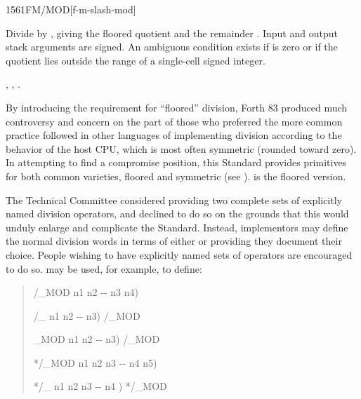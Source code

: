 \begin{worddef}{1561}{FM/MOD}[f-m-slash-mod]
\item {}

	Divide  by , giving the floored quotient
	 and the remainder . Input and output stack
	arguments are signed. An ambiguous condition exists if
	 is zero or if the quotient lies outside the range of
	a single-cell signed integer.

\see {},
	,
	.

	\begin{defer}
	\rationale %
		By introducing the requirement for ``floored'' division,
		Forth 83 produced much controversy and concern on the part of
		those who preferred the more common practice followed in other
		languages of implementing division according to the behavior
		of the host CPU, which is most often symmetric (rounded toward
		zero). In attempting to find a compromise position, this
		Standard provides primitives for both common varieties, floored
		and symmetric (see ).  is the floored
		version.

		The Technical Committee considered providing two complete sets
		of explicitly named division operators, and declined to do so
		on the grounds that this would unduly enlarge and complicate
		the Standard. Instead, implementors may define the normal
		division words in terms of either  or
		 providing they document their choice. People
		wishing to have explicitly named sets of operators are
		encouraged to do so.  may be used, for example,
		to define:

		\begin{quote}\ttfamily
			\word{:} /\_MOD  n1 n2 -{}- n3 n4)
				   
			\word{;}

			\word{:} /\_  n1 n2 -{}- n3)
				/\_MOD  
			\word{;}

			\word{:} \_MOD  n1 n2 -{}- n3)
				/\_MOD 
			\word{;}

			\word{:} */\_MOD  n1 n2 n3 -{}- n4 n5)
				   
			\word{;}

			\word{:} */\_  n1 n2 n3 -{}- n4 )
				*/\_MOD  
			\word{;}
		\end{quote}


\end{defer}
\end{worddef}
